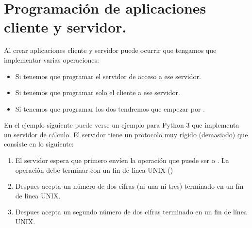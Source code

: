 \documentclass[letterpaper,10pt,spanish]{sphinxmanual}
\begin{document}
\section{Programación de aplicaciones cliente y servidor.}
\label{\detokenize{textos/tema3:programacion-de-aplicaciones-cliente-y-servidor}}
Al crear aplicaciones cliente y servidor puede ocurrir que tengamos que implementar varias operaciones:
\begin{itemize}
\item {} 
Si tenemos que programar el servidor  de acceso a ese servidor.

\item {} 
Si tenemos que programar solo el cliente  a ese servidor.

\item {} 
Si tenemos que programar los dos tendremos que empezar por .

\end{itemize}

En el ejemplo siguiente puede verse un ejemplo para Python 3 que implementa un servidor de cálculo. El servidor tiene un protocolo muy rígido (demasiado) que consiste en lo siguiente:
\begin{enumerate}
%
\item {} 
El servidor espera que primero envíen la operación que puede ser \sphinxcode{\sphinxupquote{+}} o \sphinxcode{\sphinxupquote{\sphinxhyphen{}}}. La operación debe terminar con un fin de línea UNIX ()

\item {} 
Despues acepta un número de dos cifras (ni una ni tres) terminado en un fín de línea UNIX.

\item {} 
Despues acepta un segundo número de dos cifras terminado en un fin de línea UNIX.

\end{enumerate}
\end{document}
